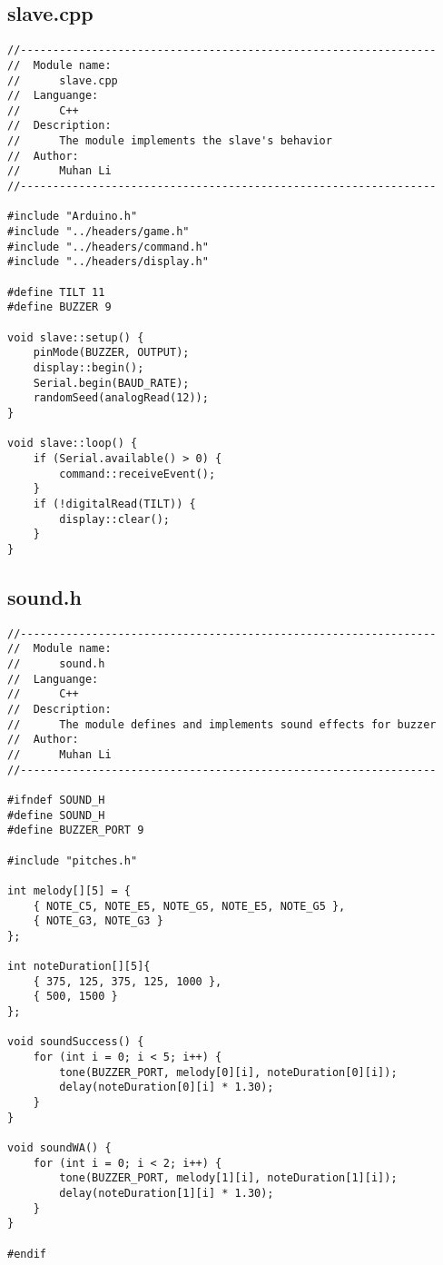 \subsection{slave.cpp}
\begin{verbatim}
//----------------------------------------------------------------
//  Module name:
//      slave.cpp
//  Languange:
//      C++
//  Description:
//      The module implements the slave's behavior
//  Author:
//      Muhan Li
//----------------------------------------------------------------

#include "Arduino.h"
#include "../headers/game.h"
#include "../headers/command.h"
#include "../headers/display.h"

#define TILT 11
#define BUZZER 9

void slave::setup() {
    pinMode(BUZZER, OUTPUT);
    display::begin();
    Serial.begin(BAUD_RATE);
    randomSeed(analogRead(12));
}

void slave::loop() {
    if (Serial.available() > 0) {
        command::receiveEvent();
    }
    if (!digitalRead(TILT)) {
        display::clear();
    }
}
\end{verbatim}

\subsection{sound.h}
\begin{verbatim}
//----------------------------------------------------------------
//  Module name:
//      sound.h
//  Languange:
//      C++
//  Description:
//      The module defines and implements sound effects for buzzer
//  Author:
//      Muhan Li
//----------------------------------------------------------------

#ifndef SOUND_H
#define SOUND_H
#define BUZZER_PORT 9

#include "pitches.h"

int melody[][5] = {
    { NOTE_C5, NOTE_E5, NOTE_G5, NOTE_E5, NOTE_G5 },
    { NOTE_G3, NOTE_G3 }
};

int noteDuration[][5]{
    { 375, 125, 375, 125, 1000 },
    { 500, 1500 }
};

void soundSuccess() {
    for (int i = 0; i < 5; i++) {
        tone(BUZZER_PORT, melody[0][i], noteDuration[0][i]);
        delay(noteDuration[0][i] * 1.30);
    }
}

void soundWA() {
    for (int i = 0; i < 2; i++) {
        tone(BUZZER_PORT, melody[1][i], noteDuration[1][i]);
        delay(noteDuration[1][i] * 1.30);
    }
}

#endif
\end{verbatim}

